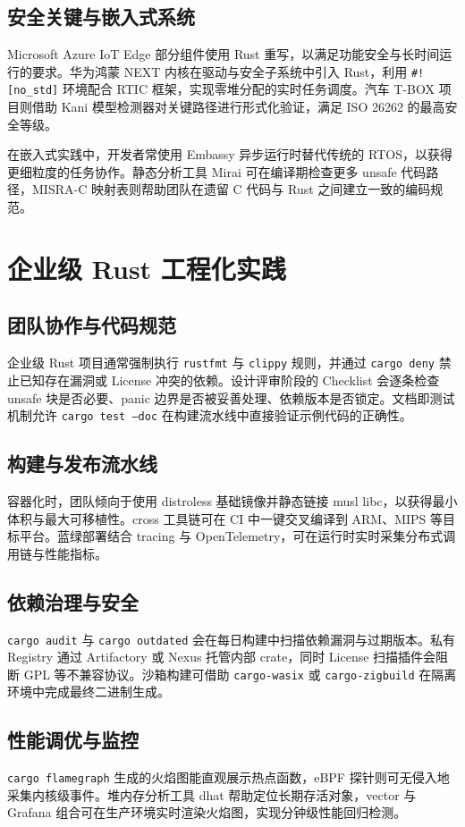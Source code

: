 \section{安全关键与嵌入式系统}
Microsoft Azure IoT Edge 部分组件使用 Rust 重写，以满足功能安全与长时间运行的要求。华为鸿蒙 NEXT 内核在驱动与安全子系统中引入 Rust，利用 \texttt{\#{}![no\_{}std]} 环境配合 RTIC 框架，实现零堆分配的实时任务调度。汽车 T-BOX 项目则借助 Kani 模型检测器对关键路径进行形式化验证，满足 ISO 26262 的最高安全等级。\par
在嵌入式实践中，开发者常使用 Embassy 异步运行时替代传统的 RTOS，以获得更细粒度的任务协作。静态分析工具 Mirai 可在编译期检查更多 unsafe 代码路径，MISRA-C 映射表则帮助团队在遗留 C 代码与 Rust 之间建立一致的编码规范。\par
\chapter{企业级 Rust 工程化实践}
\section{团队协作与代码规范}
企业级 Rust 项目通常强制执行 \texttt{rustfmt} 与 \texttt{clippy} 规则，并通过 \texttt{cargo deny} 禁止已知存在漏洞或 License 冲突的依赖。设计评审阶段的 Checklist 会逐条检查 unsafe 块是否必要、panic 边界是否被妥善处理、依赖版本是否锁定。文档即测试机制允许 \texttt{cargo test --doc} 在构建流水线中直接验证示例代码的正确性。\par
\section{构建与发布流水线}
容器化时，团队倾向于使用 distroless 基础镜像并静态链接 musl libc，以获得最小体积与最大可移植性。cross 工具链可在 CI 中一键交叉编译到 ARM、MIPS 等目标平台。蓝绿部署结合 tracing 与 OpenTelemetry，可在运行时实时采集分布式调用链与性能指标。\par
\section{依赖治理与安全}
\texttt{cargo audit} 与 \texttt{cargo outdated} 会在每日构建中扫描依赖漏洞与过期版本。私有 Registry 通过 Artifactory 或 Nexus 托管内部 crate，同时 License 扫描插件会阻断 GPL 等不兼容协议。沙箱构建可借助 \texttt{cargo-wasix} 或 \texttt{cargo-zigbuild} 在隔离环境中完成最终二进制生成。\par
\section{性能调优与监控}
\texttt{cargo flamegraph} 生成的火焰图能直观展示热点函数，eBPF 探针则可无侵入地采集内核级事件。堆内存分析工具 dhat 帮助定位长期存活对象，vector 与 Grafana 组合可在生产环境实时渲染火焰图，实现分钟级性能回归检测。\par
